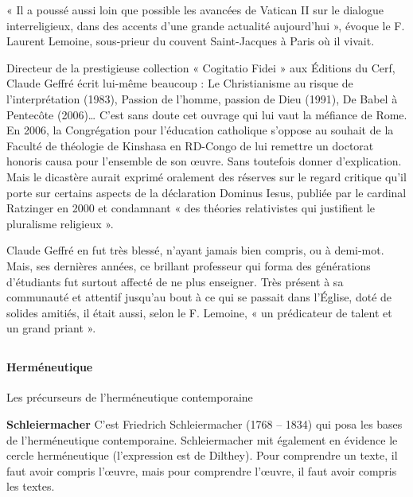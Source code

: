 « Il a poussé aussi loin que possible les avancées de Vatican II sur le dialogue interreligieux, dans des accents d’une grande actualité aujourd’hui », évoque le F. Laurent Lemoine, sous-prieur du couvent Saint-Jacques à Paris où il vivait.



Directeur de la prestigieuse collection « Cogitatio Fidei » aux Éditions du Cerf, Claude Geffré écrit lui-même beaucoup : Le Christianisme au risque de l’interprétation (1983), Passion de l’homme, passion de Dieu (1991), De Babel à Pentecôte (2006)… C’est sans doute cet ouvrage qui lui vaut la méfiance de Rome. En 2006, la Congrégation pour l’éducation catholique s’oppose au souhait de la Faculté de théologie de Kinshasa en RD-Congo de lui remettre un doctorat honoris causa pour l’ensemble de son œuvre. Sans toutefois donner d’explication. Mais le dicastère aurait exprimé oralement des réserves sur le regard critique qu’il porte sur certains aspects de la déclaration Dominus Iesus, publiée par le cardinal Ratzinger en 2000 et condamnant « des théories relativistes qui justifient le pluralisme religieux ».



Claude Geffré en fut très blessé, n’ayant jamais bien compris, ou à demi-mot. Mais, ses dernières années, ce brillant professeur qui forma des générations d’étudiants fut surtout affecté de ne plus enseigner. Très présent à sa communauté et attentif jusqu’au bout à ce qui se passait dans l’Église, doté de solides amitiés, il était aussi, selon le F. Lemoine, « un prédicateur de talent et un grand priant ».

\subsection{}
\paragraph{Herméneutique}
\begin{Def}[herméneutique]
    
\end{Def}



Les précurseurs de l'herméneutique contemporaine

 
\textbf{Schleiermacher}
C'est Friedrich Schleiermacher (1768 – 1834) qui posa les bases de l'herméneutique contemporaine. Schleiermacher mit également en évidence le cercle herméneutique (l'expression est de Dilthey). Pour comprendre un texte, il faut avoir compris l'œuvre, mais pour comprendre l'œuvre, il faut avoir compris les textes.


